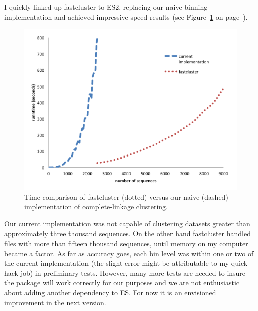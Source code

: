 
I quickly linked up fastcluster to ES2, replacing our naive binning implementation and achieved impressive speed results (see Figure~\ref{fig:FastVsNaive} on page~\pageref{fig:FastVsNaive}).
\begin{figure}[h!]
\centering
\includegraphics[scale=.8]{images/FastVsNaive-CH3}
\caption[Time comparison of fastcluster versus our naive implementation of complete-linkage clustering.]{Time comparison of fastcluster (dotted) versus our naive (dashed) implementation of complete-linkage clustering.}
\label{fig:FastVsNaive}
\end{figure}
Our current implementation was not capable of clustering datasets greater than approximately three thousand sequences.
On the other hand fastcluster handled files with more than fifteen thousand sequences, until memory on my computer became a factor.
As far as accuracy goes, each bin level was within one or two of the current implementation (the slight error might be attributable to my quick hack job) in preliminary tests.
However, many more tests are needed to insure the package will work correctly for our purposes and we are not enthusiastic about adding another dependency to ES.
For now it is an envisioned improvement in the next version.

